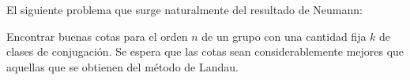 El siguiente problema que surge naturalmente 
del resultado de Neumann:

\begin{problem}[Brauer]
Encontrar buenas cotas para el orden $n$ de un grupo
con una cantidad fija $k$ de clases de conjugación. Se espera
que las cotas sean considerablemente mejores que aquellas que se obtienen
del método de Landau. 
\end{problem}


